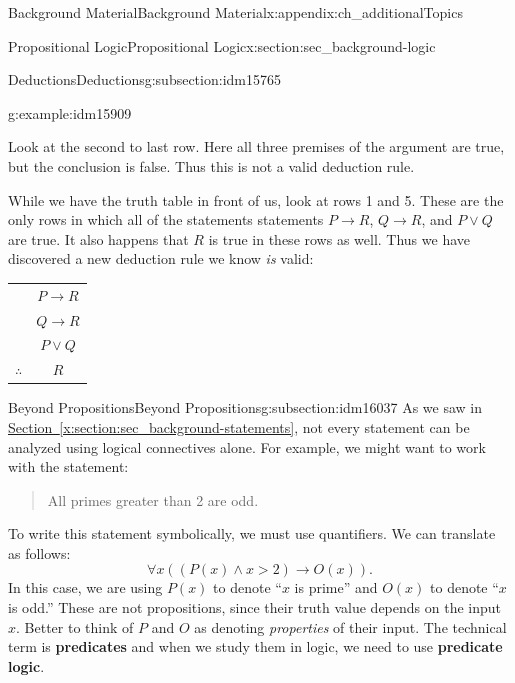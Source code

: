 \documentclass[oneside,10pt,]{book}
\newcommand{\terminology}[1]{\textbf{#1}}
\numberwithin{equation}{chapter}
\newcommand{\hrulethin}  {\noalign{\hrule height 0.04em}}
\def\imp{\rightarrow}
\newcommand{\gt}{>}
\begin{document}
\begin{appendixptx}{Background Material}{}{Background Material}{}{}{x:appendix:ch_additionalTopics}
\begin{sectionptx}{Propositional Logic}{}{Propositional Logic}{}{}{x:section:sec_background-logic}
\begin{subsectionptx}{Deductions}{}{Deductions}{}{}{g:subsection:idm15765}
\begin{example}{}{g:example:idm15909}
\begin{sidebyside}{1}{0}{0}{0}
\begin{sbspanel}{1}
\end{sbspanel}%
\end{sidebyside}%
\par
Look at the second to last row.  Here all three premises of the argument are true, but the conclusion is false.  Thus this is not a valid deduction rule.%
\par
While we have the truth table in front of us, look at rows 1 and 5.  These are the only rows in which all of the statements statements \(P \imp R\), \(Q \imp R\), and \(P\vee Q\) are true.  It also happens that \(R\) is true in these rows as well.  Thus we have discovered a new deduction rule we know \emph{is} valid:%
\begin{sidebyside}{1}{0}{0}{0}%
\begin{sbspanel}{1}%
{\centering%
\begin{tabular}{cc}
&\(P \imp R\)\tabularnewline[0pt]
&\(Q \imp R\)\tabularnewline[0pt]
&\(P \vee Q\)\tabularnewline\hrulethin
\(\therefore\)&\(R\)
\end{tabular}
\par}
\end{sbspanel}%
\end{sidebyside}%
\end{example}
\end{subsectionptx}
%
%
\typeout{************************************************}
\typeout{************************************************}
%
\begin{subsectionptx}{Beyond Propositions}{}{Beyond Propositions}{}{}{g:subsection:idm16037}
As we saw in \hyperref[x:section:sec_background-statements]{Section~\ref{x:section:sec_background-statements}}, not every statement can be analyzed using logical connectives alone.  For example, we might want to work with the statement:%
\begin{quote}%
All primes greater than 2 are odd.%
\end{quote}
To write this statement symbolically, we must use quantifiers.  We can translate as follows:%
\begin{equation*}
\forall x ((P(x) \wedge x \gt 2) \imp O(x)).
\end{equation*}
In this case, we are using \(P(x)\) to denote ``\(x\) is prime'' and \(O(x)\) to denote ``\(x\) is odd.''  These are not propositions, since their truth value depends on the input \(x\).  Better to think of \(P\) and \(O\) as denoting \emph{properties} of their input.  The technical term is \terminology{predicates} and when we study them in logic, we need to use \terminology{predicate logic}.%

\end{subsectionptx}
\end{sectionptx}
\end{appendixptx}
\end{document}
